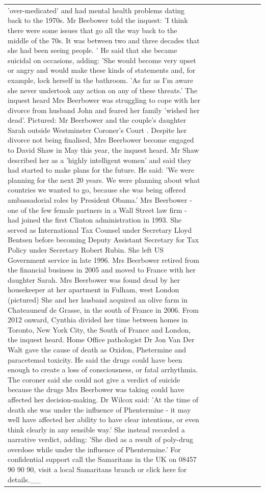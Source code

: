 \begin{table}[H]
\begin{tabular}{lllrlllll}
'over-medicated' and had mental health problems dating back to the 1970s. Mr Beebower told the inquest: 'I think there were some issues that go all the way back to the middle of the 70s. It was between two and three decades that she had been seeing people. ' He said that she became suicidal on occasions, adding: 'She would become very upset or angry and would make these kinds of statements and, for example, lock herself in the bathroom. 'As far as I'm aware she never undertook any action on any of these threats.' The inquest heard Mrs Beerbower was struggling to cope with her divorce from husband John and feared her family 'wished her dead'. Pictured: Mr Beerbower and the couple's daughter Sarah outside Westminster Coroner's Court . Despite her divorce not being finalised, Mrs Beerbower become engaged to David Shaw in May this year, the inquest heard. Mr Shaw described her as a 'highly intelligent women' and said they had started to make plans for the future. He said: 'We were planning for the next 20 years. We were planning about what countries we wanted to go, because she was being offered ambassadorial roles by President Obama.' Mrs Beerbower - one of the few female partners in a Wall Street law firm - had joined the first Clinton administration in 1993. She served as International Tax Counsel under Secretary Lloyd Bentsen before becoming Deputy Assistant Secretary for Tax Policy under Secretary Robert Rubin. She left US Government service in late 1996. Mrs Beerbower retired from the financial business in 2005 and moved to France with her daughter Sarah. Mrs Beerbower was found dead by her housekeeper at her apartment in Fulham, west London (pictured) She and her husband acquired an olive farm in Chateauneuf de Grasse, in the south of France in 2006. From 2012 onward, Cynthia divided her time between homes in Toronto, New York City, the South of France and London, the inquest heard. Home Office pathologist Dr Jon Van Der Walt gave the cause of death as Oxidon, Phetermine and paracetemol toxicity. He said the drugs could have been enough to create a loss of consciousness, or fatal arrhythmia. The coroner said she could not give a verdict of suicide because the drugs Mrs Beerbower was taking could have affected her decision-making. Dr Wilcox said: 'At the time of death she was under the influence of Phentermine - it may well have affected her ability to have clear intentions, or even think clearly in any sensible way.' She instead recorded a narrative verdict, adding: 'She died as a result of poly-drug overdose while under the influence of Phentermine.' For confidential support call the Samaritans in the UK on 08457 90 90 90, visit a local Samaritans branch or click here for details.\_\_ \\

\end{tabular}
\end{table}
